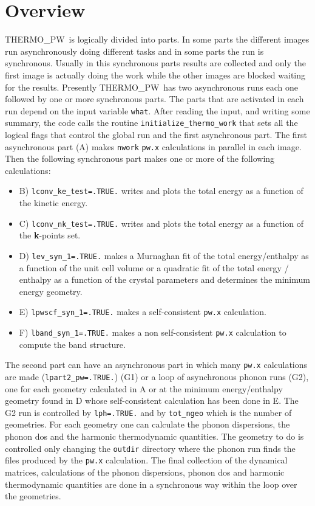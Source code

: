 \documentclass[12pt,a4paper]{article}
\def\tpw{{\sc THERMO\_PW}}
\begin{document}
\section{\color{coral}Overview}
\tpw\ is logically divided into parts. In some parts the different
images run asynchronously doing different tasks and in some parts the
run is synchronous. Usually in this synchronous parts results are 
collected and only the first image is actually doing the work while
the other images are blocked waiting for the results.
Presently \tpw\ has two asynchronous runs each one followed
by one or more synchronous parts. The parts that are activated in
each run depend on the input variable \texttt{what}. After reading the input,
and writing some summary, the code calls the routine 
\texttt{initialize\_thermo\_work} that sets all the
logical flags that control the global run and the first asynchronous
part. The first asynchronous part (A) makes \texttt{nwork} \texttt{pw.x} 
calculations in parallel in each image. 
Then the following synchronous part makes one or more of
the following calculations:
\begin{itemize}

\item
B) \texttt{lconv\_ke\_test=.TRUE.} writes and plots the total
energy as a function of the kinetic energy.

\item
C) \texttt{lconv\_nk\_test=.TRUE.} writes and plots the total energy
as a function of the {\bf k}-points set.

\item
D) \texttt{lev\_syn\_1=.TRUE.} makes a Murnaghan fit of the 
total energy/enthalpy as a function of the unit cell volume or 
a quadratic fit of the total energy / enthalpy as a function of the crystal
parameters and determines the minimum energy geometry.

\item
E) \texttt{lpwscf\_syn\_1=.TRUE.} makes a self-consistent \texttt{pw.x} 
calculation.

\item
F) \texttt{lband\_syn\_1=.TRUE.} makes a non self-consistent \texttt{pw.x}
calculation to compute the band structure.

\end{itemize}

The second part can have an asynchronous part in which
many \texttt{pw.x} calculations are made (\texttt{lpart2\_pw=.TRUE.}) (G1)
or a loop of asynchronous phonon runs (G2), one for each geometry calculated
in A or at the minimum energy/enthalpy geometry
found in D whose self-consistent calculation has been done in E.
The G2 run is controlled by \texttt{lph=.TRUE.} and by 
\texttt{tot\_ngeo} which is the number of geometries. For each geometry 
one can calculate the phonon dispersions, the phonon dos and the 
harmonic thermodynamic quantities. The geometry to do is controlled only 
changing the \texttt{outdir} directory where the phonon run finds the
files produced by the \texttt{pw.x} calculation. The final collection
of the dynamical matrices, calculations of the phonon dispersions, phonon 
dos and harmonic thermodynamic quantities are done in a synchronous way 
within the loop over the geometries.
\end{document}

